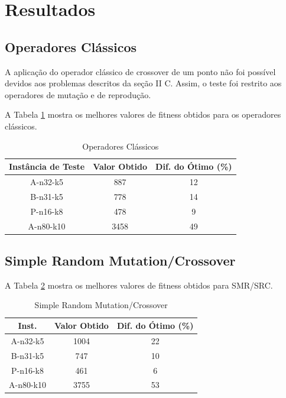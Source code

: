 \documentclass[conference]{IEEEtran}
\begin{document}
\section{Resultados}

\subsection{Operadores Clássicos}
A aplicação do operador clássico de crossover de um ponto não foi possível devidos aos problemas descritos da seção II C. Assim, o teste foi restrito aos operadores de mutação e de reprodução. 

A Tabela \ref{table_classical_operators} mostra os melhores valores de fitness obtidos para os operadores clássicos.

\begin{table}[!t]
\renewcommand{\arraystretch}{1.3}
\centering
\caption{Operadores Clássicos}
\label{table_classical_operators}
\begin{tabular}{|c||c||c|}
\hline
Instância de Teste & Valor Obtido & Dif. do Ótimo (\%)\\
\hline
A-n32-k5 & 887 & 12\\
B-n31-k5 & 778 & 14\\
P-n16-k8 & 478 & 9\\
A-n80-k10 & 3458 & 49\\
\hline
\end{tabular}
\end{table}

\subsection{Simple Random Mutation/Crossover}
A Tabela \ref{table_srm} mostra os melhores valores de fitness obtidos para SMR/SRC.

\begin{table}[!t]
\renewcommand{\arraystretch}{1.3}
\centering
\caption{Simple Random Mutation/Crossover}
\label{table_srm}
\begin{tabular}{|c||c||c|}
\hline
Inst. & Valor Obtido & Dif. do Ótimo (\%)\\
\hline
A-n32-k5 & 1004 & 22\\
B-n31-k5 & 747 & 10\\
P-n16-k8 & 461 & 6\\
A-n80-k10 & 3755 & 53\\
\hline
\end{tabular}
\end{table}
\end{document}
